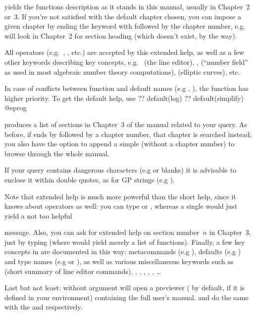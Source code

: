  yields the functions description as it stands in this
manual, usually in Chapter~2 or~3. If you're not satisfied with the default
chapter chosen, you can impose a given chapter by ending the keyword with
 followed by the chapter number, e.g.~ will look in
Chapter~2 for section heading  (which doesn't exist, by the way).

All operators (e.g.~\kbd{+}, \kbd{\&\&}, etc.) are accepted by this
extended help, as well as a few other keywords describing key  concepts,
e.g.~ (the line editor), ,  (``number
field'' as used in most algebraic number theory computations), 
(elliptic curves), etc.

In case of conflicts between function and default names (e.g ,
), the function has higher priority. To get the default help,
use
\bprog
  ?? default(log)
  ?? default(simplify)
@eprog

 produces a list of sections in Chapter~3 of the
manual related to your query. As before, if  ends by 
followed by a chapter number, that chapter is searched instead; you also
have the option to append a simple  (without a chapter number) to
browse through the whole manual.

If your query contains dangerous characters (e.g  or blanks) it is
advisable to enclose it within double quotes, as for GP strings (e.g
).

Note that extended help is much more powerful than the short help, since
it knows about operators as well: you can type  or
, whereas a single  would just yield a not too helpful


\noindent message. Also, you can ask for extended help on section
number~$n$ in Chapter~3, just by typing  (where  would
yield merely a list of functions). Finally, a few key concepts in  are
documented in this way: metacommands (e.g ), defaults (e.g
) and type names (e.g  or ), as well as
various miscellaneous keywords such as  (short summary of line
editor commands), , , ,
, , \dots

Last but not least:  without argument will open a 
previewer ( by default,  if it is defined in your
environment) containing the full user's manual.  and
 do the same with the  and 
respectively.

